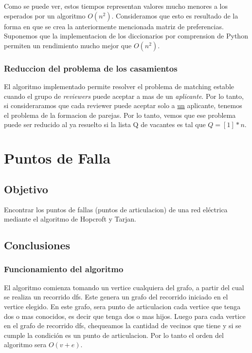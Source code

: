 \documentclass{article}
\begin{document}
                Como se puede ver, estos tiempos representan valores mucho menores a
                los esperados por un algoritmo $O(n^2)$. Consideramos que esto es
                resultado de la forma en que se crea la anteriormente mencionada
                matriz de preferencias. Suponemos que la implementacion de los
                diccionarios por comprension de Python permiten un rendimiento mucho
                mejor que $O(n^2)$.
            \subsubsection{Reduccion del problema de los casamientos}
                El algoritmo implementado permite resolver el problema de matching
                estable cuando el grupo de \emph{reviewers} puede aceptar a mas de
                un \emph{aplicante}. Por lo tanto, si consideraramos que cada reviewer
                puede aceptar solo a \underline{un} aplicante, tenemos el problema
                de la formacion de parejas. Por lo tanto, vemos que ese problema
                puede ser reducido al ya resuelto si la lista Q de vacantes es tal
                que $Q = [1]*n$.

    \section{Puntos de Falla}
        \subsection{Objetivo}
            Encontrar los puntos de fallas (puntos de articulacion) de una red eléctrica
            mediante el algoritmo de Hopcroft y Tarjan.
        \subsection{Conclusiones}
            \subsubsection{Funcionamiento del algoritmo}
                El algoritmo comienza tomando un vertice cualquiera del grafo, a partir
                del cual se realiza un recorrido dfs. Este genera un grafo del recorrido
                iniciado en el vertice elegido. En este grafo, sera punto de articulacion
                cada vertice que tenga dos o mas conocidos, es decir que tenga dos o mas
                hijos. Luego para cada vertice en el grafo de recorrido dfs, chequeamos
                la cantidad de vecinos que tiene y si se cumple la condición es un punto
                de articulacion. Por lo tanto el orden del algoritmo sera $O(v+e)$.
\end{document}
